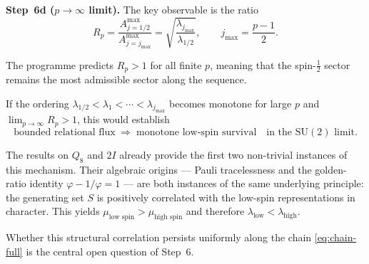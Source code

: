 \documentclass[11pt,a4paper]{article}
\begin{document}
      \medskip
      \noindent\textbf{Step~6d ($p\to\infty$ limit).}
      The key observable is the ratio
      \begin{equation}
        R_p
        =
        \frac{A^{\max}_{j=1/2}}{A^{\max}_{j=j_{\max}}}
        =
        \sqrt{\frac{\lambda_{j_{\max}}}{\lambda_{1/2}}},
        \qquad
        j_{\max} = \frac{p-1}{2}.
        \label{eq:ratio-p}
      \end{equation}

      The programme predicts $R_p>1$ for all finite $p$,
      meaning that the spin-$\tfrac12$ sector remains the most
      admissible sector along the sequence.

      If the ordering
      $\lambda_{1/2} < \lambda_1 < \cdots < \lambda_{j_{\max}}$
      becomes monotone for large $p$ and
      $\lim_{p\to\infty} R_p > 1$,
      this would establish
      \begin{equation}
        \text{bounded relational flux}
        \;\Longrightarrow\;
        \text{monotone low-spin survival}
        \quad
        \text{in the }\mathrm{SU}(2)\text{ limit.}
        \label{eq:conclusion}
      \end{equation}

      The results on $Q_8$ and $2I$ already provide the first two
      non-trivial instances of this mechanism.
      Their algebraic origins — Pauli tracelessness and the golden-ratio
      identity $\varphi - 1/\varphi = 1$ — are both instances of the same
      underlying principle: the generating set $S$ is positively correlated
      with the low-spin representations in character.
      This yields
      $\mu_{\text{low spin}} > \mu_{\text{high spin}}$
      and therefore
      $\lambda_{\text{low}} < \lambda_{\text{high}}$.

      Whether this structural correlation persists uniformly along the chain
      \eqref{eq:chain-full} is the central open question of Step~6.
\end{document}
